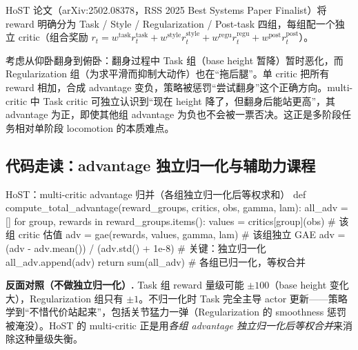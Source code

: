 HoST 论文（arXiv:2502.08378，RSS 2025 Best Systems Paper Finalist）将 reward 明确分为 Task / Style / Regularization / Post-task 四组，每组配一个独立 critic（组合奖励 $r_t=w^{\text{task}}r^{\text{task}}_t+w^{\text{style}}r^{\text{style}}_t+w^{\text{regu}}r^{\text{regu}}_t+w^{\text{post}}r^{\text{post}}_t$）。

\begin{insight}\label{ins:rlmc-hl-multicritic}
考虑从仰卧翻身到俯卧：翻身过程中 Task 组（base height 暂降）暂时恶化，而 Regularization 组（为求平滑而抑制大动作）也在“拖后腿”。单 critic 把所有 reward 相加，合成 advantage 变负，策略被惩罚“尝试翻身”这个正确方向。multi-critic 中 Task critic 可独立认识到“现在 height 降了，但翻身后能站更高”，其 advantage 为正，即使其他组 advantage 为负也不会被一票否决。这正是多阶段任务相对单阶段 locomotion 的本质难点。
\end{insight}

\subsection{代码走读：advantage 独立归一化与辅助力课程}

\begin{codebox}[Python]{HoST：multi-critic advantage 归并（各组独立归一化后等权求和）}
def compute_total_advantage(reward_groups, critics, obs, gamma, lam):
    all_adv = []
    for group, rewards in reward_groups.items():
        values = critics[group](obs)                 # 该组 critic 估值
        adv = gae(rewards, values, gamma, lam)        # 该组独立 GAE
        adv = (adv - adv.mean()) / (adv.std() + 1e-8) # 关键：独立归一化
        all_adv.append(adv)
    return sum(all_adv)                                # 各组已归一化，等权合并
\end{codebox}

\begin{note}
\textbf{反面对照（不做独立归一化）.}\;
Task 组 reward 量级可能 $\pm100$（base height 变化大），Regularization 组只有 $\pm1$。不归一化时 Task 完全主导 actor 更新——策略学到“不惜代价站起来”，包括关节猛力一弹（Regularization 的 smoothness 惩罚被淹没）。HoST 的 multi-critic 正是用\emph{各组 advantage 独立归一化后等权合并}来消除这种量级失衡。
\end{note}

